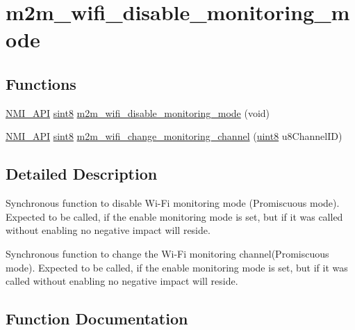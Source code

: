 \hypertarget{group__WifiDisableMonitorModeFn}{}\section{m2m\+\_\+wifi\+\_\+disable\+\_\+monitoring\+\_\+mode}
\label{group__WifiDisableMonitorModeFn}
\subsection*{Functions}
\begin{DoxyCompactItemize}
\item 
\hyperlink{group__BSPDefine_gaecc0323d771e41ef81a76b5f12783e22}{N\+M\+I\+\_\+\+A\+PI} \hyperlink{group__DataT_gae35f10ffd0ac8dd2bc3e794da9bdfbc7}{sint8} \hyperlink{group__WifiDisableMonitorModeFn_ga22d6c3d2f63fceac652835994cb15594}{m2m\+\_\+wifi\+\_\+disable\+\_\+monitoring\+\_\+mode} (void)
\item 
\hyperlink{group__BSPDefine_gaecc0323d771e41ef81a76b5f12783e22}{N\+M\+I\+\_\+\+A\+PI} \hyperlink{group__DataT_gae35f10ffd0ac8dd2bc3e794da9bdfbc7}{sint8} \hyperlink{group__WifiDisableMonitorModeFn_gade1916a9e1b4885877ce0551bda545d7}{m2m\+\_\+wifi\+\_\+change\+\_\+monitoring\+\_\+channel} (\hyperlink{group__DataT_ga4df709a77647e870bbf1d955b8edc9a6}{uint8} u8\+Channel\+ID)
\end{DoxyCompactItemize}


\subsection{Detailed Description}
Synchronous function to disable Wi-\/\+Fi monitoring mode (Promiscuous mode). Expected to be called, if the enable monitoring mode is set, but if it was called without enabling no negative impact will reside.

Synchronous function to change the Wi-\/\+Fi monitoring channel(\+Promiscuous mode). Expected to be called, if the enable monitoring mode is set, but if it was called without enabling no negative impact will reside. 

\subsection{Function Documentation}
\mbox{\label{group__WifiDisableMonitorModeFn_gade1916a9e1b4885877ce0551bda545d7}} 
